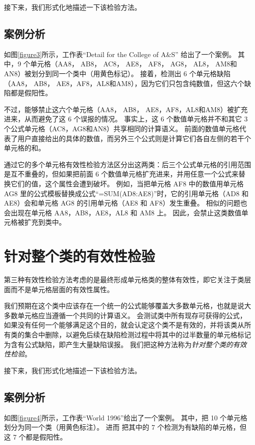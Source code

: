 接下来，我们形式化地描述一下该检验方法。

\subsection{案例分析}

如图\ref{figure3}所示，工作表“Detail for the College of A\&S” 给出了一个案例。
其中，9 个单元格（AA8， AB8， AC8， AE8， AF8， AG8， AL8， AM8和AN8）被\cu 划分到同一个类中（用黄色标记）。
接着，\cu 检测出 6 个单元格缺陷（AA8， AB8， AE8，AF8，AL8和AM8），因为它们只包含纯数值，但这六个缺陷都是假阳性。

不过，\wa 能够禁止这六个单元格（AA8， AB8， AE8，AF8，AL8和AM8）被扩充进来，从而避免了这 6 个误报的情况。
事实上，这 6 个数值单元格并不和其它 3 个公式单元格（AC8，AG8和AN8）共享相同的计算语义。
前面的数值单元格代表了用户直接给出的具体的数值，而另外三个公式则是计算它们各自左侧的若干个单元格的和。

\wa 通过它的多个单元格有效性检验方法区分出这两类：后三个公式单元格的引用范围是互不重叠的，但如果把前面 6 个数值单元格扩充进来，并用任意一个公式来替换它们的值，这个属性会遭到破坏。
例如，当把单元格 AF8 中的数值用单元格 AG8 里的公式模板替换成公式“=SUM(AD8:AE8)”时，它的引用单元格（AD8 和 AE8）会和单元格 AG8 的引用单元格（AE8 和 AF8）发生重叠。
相似的问题也会出现在单元格 AA8，AB8，AE8，AL8 和 AM8 上。
因此，\wa 会禁止这类数值单元格被扩充到类中。


\section{针对整个类的有效性检验}
第三种有效性检验方法考虑的是最终形成单元格类的整体有效性，即它关注于类层面而不是单元格层面的有效性属性。

我们预期在这个类中应该存在一个统一的公式能够覆盖大多数单元格，也就是说大多数单元格应当遵循一个共同的计算语义。
\wa 会测试类中所有现存可获得的公式，如果没有任何一个能够满足这个目的，\wa 就会认定这个类不是有效的，并将该类从所有类的集合中删除，以避免后续在缺陷检测过程中将其中的过半数量的单元格标记为含有公式缺陷，即产生大量缺陷误报。
我们把这种方法称为\textit{针对整个类的有效性检验}。

接下来，我们形式化地描述一下该检验方法。

\subsection{案例分析}

如图\ref{figure4}所示，工作表“World 1996”给出了一个案例。
其中，\cu 把 10 个单元格划分为同一个类（用黄色标注）。
进而 \cu 把其中的 7 个检测为有缺陷的单元格，但这 7 个都是假阳性。

